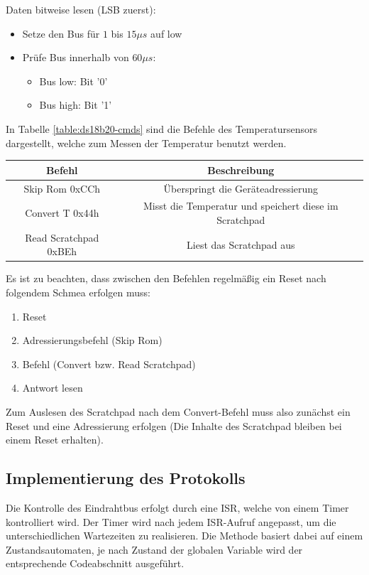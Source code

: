 \documentclass
[ 12pt,
  parskip=half %
]{scrreprt}
\begin{document}
Daten bitweise lesen (LSB zuerst):
\begin{itemize}
	\item Setze den Bus für $1$ bis $15 \mu{s}$ auf low
	\item Prüfe Bus innerhalb von $60 \mu{s}$:
	\begin{itemize}
		\item Bus low: Bit '0'
		\item Bus high: Bit '1'
	\end{itemize}
\end{itemize}

In Tabelle \ref{table:ds18b20-cmds} sind die Befehle des Temperatursensors dargestellt, welche zum Messen der Temperatur benutzt werden.

\begin{center}
	\begin{tabulary}{\columnwidth}{|C|C|}
		\hline
		\textbf{Befehl} & \textbf{Beschreibung}\\
		\hline
		Skip Rom 0xCCh & Überspringt die Geräteadressierung\\
		\hline
		Convert T 0x44h & Misst die Temperatur und speichert diese im Scratchpad\\
		\hline
		Read Scratchpad 0xBEh & Liest das Scratchpad aus\\
		\hline
	\end{tabulary}
	\label{table:ds18b20-cmds}
\end{center}

Es ist zu beachten, dass zwischen den Befehlen regelmäßig ein Reset nach folgendem Schmea erfolgen muss: 
\begin{enumerate}
	\item Reset
	\item Adressierungsbefehl (Skip Rom)
	\item Befehl (Convert bzw. Read Scratchpad)
	\item Antwort lesen
\end{enumerate}

Zum Auslesen des Scratchpad nach dem Convert-Befehl muss also zunächst ein Reset und eine Adressierung erfolgen (Die Inhalte des Scratchpad bleiben bei einem Reset erhalten).

\subsection{Implementierung des Protokolls}

Die Kontrolle des Eindrahtbus erfolgt durch eine ISR, welche von einem Timer kontrolliert wird. Der Timer wird nach jedem ISR-Aufruf angepasst, um die unterschiedlichen Wartezeiten zu realisieren. Die Methode basiert dabei auf einem Zustandsautomaten, je nach Zustand der globalen Variable  wird der entsprechende Codeabschnitt ausgeführt.
\end{document}
